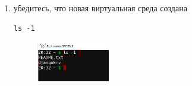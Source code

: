 \documentclass[12pt]{article}
\begin{document}
\begin{enumerate}
    \item убедитесь, что новая виртуальная среда создана
			\begin{lstlisting}[caption=\phantom{},style=conlst,label={lst:enter_desktop}]
      ls -1
			\end{lstlisting}
	\begin{figure}[H]
		\centering
		\includegraphics[width=0.3\textwidth ,keepaspectratio]{imgs/check_venv_creation.png}
		\caption{}
	\end{figure}
	\end{enumerate}
\end{document}
